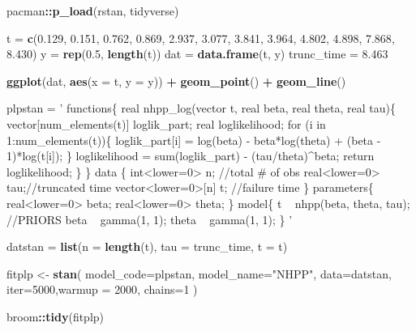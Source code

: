 \documentclass[]{article}
\newenvironment{Shaded}{\begin{snugshade}}{\end{snugshade}}
\newcommand{\DataTypeTok}[1]{\textcolor[rgb]{0.13,0.29,0.53}{#1}}
\newcommand{\DecValTok}[1]{\textcolor[rgb]{0.00,0.00,0.81}{#1}}
\newcommand{\FloatTok}[1]{\textcolor[rgb]{0.00,0.00,0.81}{#1}}
\newcommand{\KeywordTok}[1]{\textcolor[rgb]{0.13,0.29,0.53}{\textbf{#1}}}
\newcommand{\NormalTok}[1]{#1}
\newcommand{\OperatorTok}[1]{\textcolor[rgb]{0.81,0.36,0.00}{\textbf{#1}}}
\newcommand{\StringTok}[1]{\textcolor[rgb]{0.31,0.60,0.02}{#1}}
\begin{document}
\begin{Shaded}
\begin{Highlighting}[]
\NormalTok{pacman}\OperatorTok{::}\KeywordTok{p_load}\NormalTok{(rstan, tidyverse)}


\NormalTok{t =}\StringTok{ }\KeywordTok{c}\NormalTok{(}\FloatTok{0.129}\NormalTok{, }\FloatTok{0.151}\NormalTok{, }\FloatTok{0.762}\NormalTok{, }\FloatTok{0.869}\NormalTok{, }\FloatTok{2.937}\NormalTok{, }\FloatTok{3.077}\NormalTok{, }\FloatTok{3.841}\NormalTok{, }\FloatTok{3.964}\NormalTok{, }\FloatTok{4.802}\NormalTok{, }\FloatTok{4.898}\NormalTok{, }\FloatTok{7.868}\NormalTok{, }\FloatTok{8.430}\NormalTok{)}
\NormalTok{y =}\StringTok{ }\KeywordTok{rep}\NormalTok{(}\FloatTok{0.5}\NormalTok{, }\KeywordTok{length}\NormalTok{(t))}
\NormalTok{dat =}\StringTok{ }\KeywordTok{data.frame}\NormalTok{(t, y)}
\NormalTok{trunc_time =}\StringTok{ }\FloatTok{8.463}

\KeywordTok{ggplot}\NormalTok{(dat, }\KeywordTok{aes}\NormalTok{(}\DataTypeTok{x =}\NormalTok{ t, }\DataTypeTok{y =}\NormalTok{ y)) }\OperatorTok{+}\StringTok{ }\KeywordTok{geom_point}\NormalTok{() }\OperatorTok{+}\StringTok{ }\KeywordTok{geom_line}\NormalTok{()}

\NormalTok{plpstan =}\StringTok{ '}
\StringTok{functions\{}
\StringTok{  real nhpp_log(vector t, real beta, real theta, real tau)\{}
\StringTok{    vector[num_elements(t)] loglik_part;}
\StringTok{    real loglikelihood;}
\StringTok{    for (i in 1:num_elements(t))\{}
\StringTok{      loglik_part[i] = log(beta) - beta*log(theta) + (beta - 1)*log(t[i]);}
\StringTok{    \}}
\StringTok{    loglikelihood = sum(loglik_part) - (tau/theta)^beta;}
\StringTok{    return loglikelihood;}
\StringTok{  \}}
\StringTok{\}}
\StringTok{data \{}
\StringTok{  int<lower=0> n; //total # of obs}
\StringTok{  real<lower=0> tau;//truncated time}
\StringTok{  vector<lower=0>[n] t; //failure time}
\StringTok{\}}
\StringTok{parameters\{}
\StringTok{  real<lower=0> beta;}
\StringTok{  real<lower=0> theta;}
\StringTok{\}}
\StringTok{model\{}
\StringTok{  t ~ nhpp(beta, theta, tau);}
\StringTok{//PRIORS}
\StringTok{beta ~ gamma(1, 1);}
\StringTok{theta ~ gamma(1, 1);}
\StringTok{\}}
\StringTok{'}

\NormalTok{datstan =}\StringTok{ }\KeywordTok{list}\NormalTok{(}\DataTypeTok{n =} \KeywordTok{length}\NormalTok{(t),}
               \DataTypeTok{tau =}\NormalTok{ trunc_time,}
               \DataTypeTok{t =}\NormalTok{ t)}

\NormalTok{fitplp <-}\StringTok{ }\KeywordTok{stan}\NormalTok{(}
  \DataTypeTok{model_code=}\NormalTok{plpstan, }\DataTypeTok{model_name=}\StringTok{"NHPP"}\NormalTok{, }\DataTypeTok{data=}\NormalTok{datstan, }
  \DataTypeTok{iter=}\DecValTok{5000}\NormalTok{,}\DataTypeTok{warmup =} \DecValTok{2000}\NormalTok{, }\DataTypeTok{chains=}\DecValTok{1}
\NormalTok{)}


\NormalTok{broom}\OperatorTok{::}\KeywordTok{tidy}\NormalTok{(fitplp)}
\end{Highlighting}
\end{Shaded}
\end{document}
